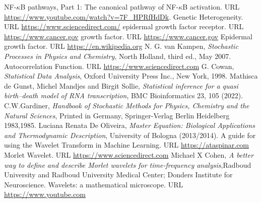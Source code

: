 \documentclass[12pt,a4paper]{report}
\begin{document}
\begin{thebibliography}{bibliography}
     NF-$\kappa$B pathways, Part 1: The canonical pathway of NF-$\kappa$B activation. URL \url{https://www.youtube.com/watch?v=7F_HPRfHdDk}.
     Genetic Heterogeneity. URL \href{https://www.sciencedirect.com/topics/biochemistry-genetics-and-molecular-biology/genetic-heterogeneity}{https://www.sciencedirect.com/}
     epidermal growth factor receptor. URL \href{https://www.cancer.gov/publications/dictionaries/cancer-terms/def/epidermal-growth-factor-receptor}{https://www.cancer.gov}
     growth factor. URL \href{https://www.cancer.gov/publications/dictionaries/cancer-terms/def/growth-factor}{https://www.cancer.gov}
     Epidermal growth factor. URL \href{https://en.wikipedia.org/wiki/Epidermal_growth_factor}{https://en.wikipedia.org}
     N. G. van Kampen, {\em Stochastic Processes in Physics and Chemistry}, North Holland, third ed., May 2007.
     Autocorrelation Function. URL \href{https://www.sciencedirect.com/topics/chemistry/autocorrelation-function#:~:text=1%20Autocorrelation-,The%20autocorrelation%20function%20(ACF)%20defines%20how%20data%20points%20in%20a,signal%20over%20different%20delay%20times.}{https://www.sciencedirect.com}
     G. Cowan, {\em Statistical Data Analysis}, Oxford University Press Inc., New York, 1998.
     Mathisca de Gunst, Michel Mandjes and Birgit Sollie, {\em Statistical inference for a quasi birth–death model of RNA transcription}, BMC Bioinformatics 23, 105 (2022).
     C.W.Gardiner, {\em Handbook of Stochastic Methods for Physics, Chemistry and the Natural Sciences}, Printed in Germany, Springer-Verlag Berlin Heidelberg 1983,1985.
     Luciana Renata De Oliveira, {\em Master Equation: Biological Applications and Thermodynamic Description}, University of Bologna (2013/2014).
      A guide for using the Wavelet Transform in Machine Learning. URL \href{https://ataspinar.com/2018/12/21/a-guide-for-using-the-wavelet-transform-in-machine-learning/}{https://ataspinar.com}
     Morlet Wavelet. URL \href{https://www.sciencedirect.com/topics/mathematics/morlet-wavelet}{https://www.sciencedirect.com}
     Michael X Cohen, {\em A better way to define and describe Morlet wavelets
    for time-frequency analysis},Radboud University and Radboud University Medical Center; Donders Institute for Neuroscience.
     Wavelets: a mathematical microscope. URL \href{https://www.youtube.com/watch?v=jnxqHcObNK4&t=1320s}{https://www.youtube.com}

\end{thebibliography}
\end{document}
